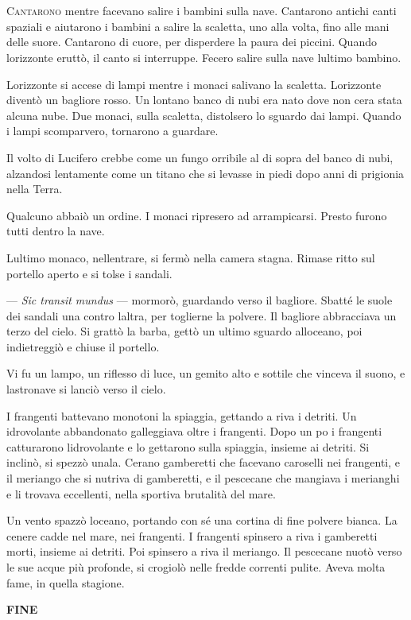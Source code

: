 	\chapter{\phantom{text}}

\lettrine{C}{antarono} mentre facevano salire i bambini sulla nave. Cantarono antichi
canti spaziali e aiutarono i bambini a salire la scaletta, uno alla
volta, fino alle mani delle suore. Cantarono di cuore, per disperdere la
paura dei piccini. Quando l\textquotesingle orizzonte eruttò, il canto
si interruppe. Fecero salire sulla nave l\textquotesingle ultimo
bambino.

L\textquotesingle orizzonte si accese di lampi mentre i monaci salivano
la scaletta. L\textquotesingle orizzonte diventò un bagliore rosso. Un
lontano banco di nubi era nato dove non c\textquotesingle era stata
alcuna nube. Due monaci, sulla scaletta, distolsero lo sguardo dai
lampi. Quando i lampi scomparvero, tornarono a guardare.

Il volto di Lucifero crebbe come un fungo orribile al di sopra del banco
di nubi, alzandosi lentamente come un titano che si levasse in piedi
dopo anni di prigionia nella Terra.

Qualcuno abbaiò un ordine. I monaci ripresero ad arrampicarsi. Presto
furono tutti dentro la nave.

L\textquotesingle ultimo monaco, nell\textquotesingle entrare, si fermò
nella camera stagna. Rimase ritto sul portello aperto e si tolse i
sandali.

--- \emph{Sic transit mundus} --- mormorò, guardando verso il bagliore.
Sbatté le suole dei sandali una contro l\textquotesingle altra, per
toglierne la polvere. Il bagliore abbracciava un terzo del cielo. Si
grattò la barba, gettò un ultimo sguardo all\textquotesingle oceano, poi
indietreggiò e chiuse il portello.

Vi fu un lampo, un riflesso di luce, un gemito alto e sottile che
vinceva il suono, e l\textquotesingle astronave si lanciò verso il
cielo.

I frangenti battevano monotoni la spiaggia, gettando a riva i detriti.
Un idrovolante abbandonato galleggiava oltre i frangenti. Dopo un
po\textquotesingle{} i frangenti catturarono
l\textquotesingle idrovolante e lo gettarono sulla spiaggia, insieme ai
detriti. Si inclinò, si spezzò un\textquotesingle ala.
C\textquotesingle erano gamberetti che facevano caroselli nei frangenti,
e il meriango che si nutriva di gamberetti, e il pescecane che mangiava
i merianghi e li trovava eccellenti, nella sportiva brutalità del mare.

Un vento spazzò l\textquotesingle oceano, portando con sé una cortina di
fine polvere bianca. La cenere cadde nel mare, nei frangenti. I
frangenti spinsero a riva i gamberetti morti, insieme ai detriti. Poi
spinsero a riva il meriango. Il pescecane nuotò verso le sue acque più
profonde, si crogiolò nelle fredde correnti pulite. Aveva molta fame, in
quella stagione.

\hfill\break

\hfill\break

\begin{center}
	\textbf{FINE}
\end{center}